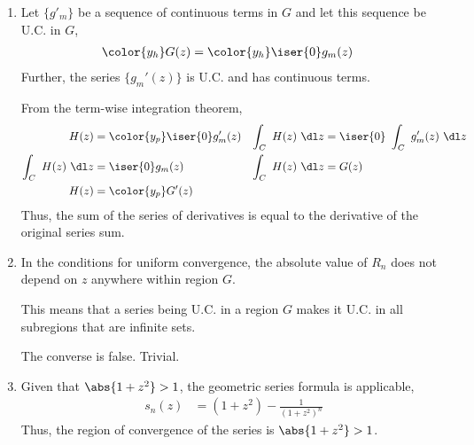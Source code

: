 \begin{enumerate}
\begin{enumerate}
              \item Let $ \{g'_m\} $ be a sequence of continuous terms in $ G $ and let
                    this sequence be U.C. in $ G $,
                    \begin{align}
                        \color{y_h} G(z) & = \color{y_h} \iser{0} g_m(z)
                    \end{align}
                    Further, the series $ \{g_m'(z)\} $ is U.C. and has continuous
                    terms. \par
                    From the term-wise integration theorem,
                    \begin{align}
                        H(z)                & = \color{y_p} \iser{0} g'_m(z)     &
                        \int_C\ H(z)\ \dl z & = \iser{0}\ \int_C\ g'_m(z)\ \dl z   \\
                        \int_C\ H(z)\ \dl z & = \iser{0} g_m(z)                  &
                        \int_C\ H(z)\ \dl z & = G(z)                               \\
                        H(z)                & = \color{y_p} G'(z)
                    \end{align}
                    Thus, the sum of the series of derivatives is equal to the derivative
                    of the original series sum.

              \item In the conditions for uniform convergence, the absolute value
                    of $ R_n $ does not depend on $ z $ anywhere within region $ G $. \par
                    This means that a series being U.C. in a region $ G $ makes it
                    U.C. in all subregions that are infinite sets. \par
                    The converse is false. Trivial.

              \item Given that $ \abs{1 + z^2} > 1 $, the geometric series formula is
                    applicable,
                    \begin{align}
                        s_n(z) & = (1 + z^2) - \frac{1}{(1 + z^2)^n}
                    \end{align}
                    Thus, the region of convergence of the series is $ \abs{1 + z^2}
                        > 1 $.


\end{enumerate}
\end{enumerate}
